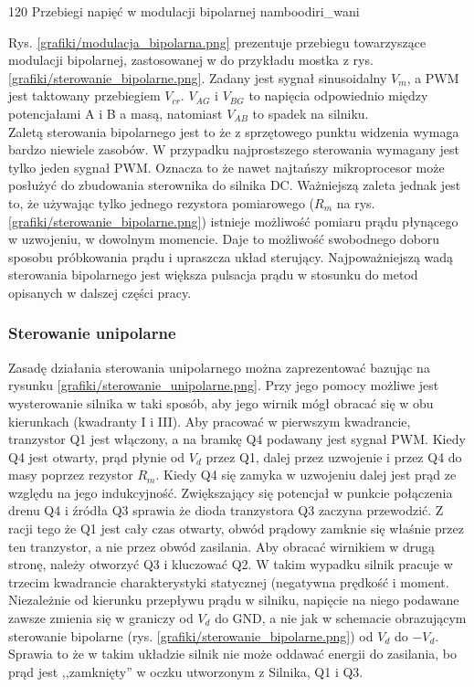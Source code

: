 	{120}
	{Przebiegi napięć w modulacji bipolarnej}
	{namboodiri_wani}
	
Rys. \ref{grafiki/modulacja_bipolarna.png} prezentuje przebiegu towarzyszące modulacji bipolarnej, zastosowanej w do przykładu mostka z rys. \ref{grafiki/sterowanie_bipolarne.png}. Zadany jest sygnał sinusoidalny $ V_m $, a PWM jest taktowany przebiegiem $ V_{cr} $. $ V_{AG} $ i $ V_{BG} $ to napięcia odpowiednio między potencjałami A i B a masą, natomiast $ V_{AB} $ to spadek na silniku. \\

Zaletą sterowania bipolarnego jest to że z sprzętowego punktu widzenia wymaga bardzo niewiele zasobów. W przypadku najprostszego sterowania wymagany jest tylko jeden sygnał PWM. Oznacza to że nawet najtańszy mikroprocesor może posłużyć do zbudowania sterownika do silnika DC. Ważniejszą zaleta jednak jest to, że używając tylko jednego rezystora pomiarowego ($ R_m $ na rys. \ref{grafiki/sterowanie_bipolarne.png}) istnieje możliwość pomiaru prądu płynącego w uzwojeniu, w dowolnym momencie. Daje to możliwość swobodnego doboru sposobu próbkowania prądu i upraszcza układ sterujący. Najpoważniejszą wadą sterowania bipolarnego jest większa pulsacja prądu w stosunku do metod opisanych w dalszej części pracy.

\subsubsection{Sterowanie unipolarne}
\label{sss:moduni}

Zasadę działania sterowania unipolarnego można zaprezentować bazując na rysunku \ref{grafiki/sterowanie_unipolarne.png}. Przy jego pomocy możliwe jest wysterowanie silnika w taki sposób, aby jego wirnik mógł obracać się w obu kierunkach (kwadranty I i III). Aby pracować w pierwszym kwadrancie, tranzystor Q1 jest włączony, a na bramkę Q4 podawany jest sygnał PWM. Kiedy Q4 jest otwarty, prąd płynie od $ V_d $ przez Q1, dalej przez uzwojenie i przez Q4 do masy poprzez rezystor $ R_m $. Kiedy Q4 się zamyka w uzwojeniu dalej jest prąd ze względu na jego indukcyjność. Zwiększający się potencjał w punkcie połączenia drenu Q4 i źródła Q3 sprawia że dioda tranzystora Q3 zaczyna przewodzić. Z racji tego że Q1 jest cały czas otwarty, obwód prądowy zamknie się właśnie przez ten tranzystor, a nie przez obwód zasilania. Aby obracać wirnikiem w drugą stronę, należy otworzyć Q3 i kluczować Q2. W takim wypadku silnik pracuje w trzecim kwadrancie charakterystyki statycznej (negatywna prędkość i moment. Niezależnie od kierunku przepływu prądu w silniku, napięcie na niego podawane zawsze zmienia się w graniczy od $ V_d $ do GND, a nie jak w schemacie obrazującym sterowanie bipolarne (rys. \ref{grafiki/sterowanie_bipolarne.png}) od $ V_d $ do $ -V_d $. Sprawia to że w takim układzie silnik nie może oddawać energii do zasilania, bo prąd jest ,,zamknięty'' w oczku utworzonym z Silnika, Q1 i Q3. 

